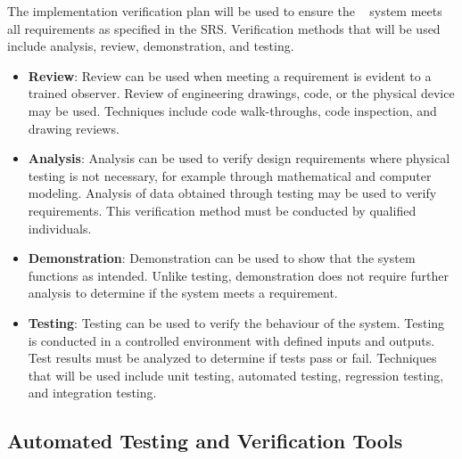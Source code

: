 \documentclass[12pt, titlepage]{article}
\begin{document}
  The implementation verification plan will be used to ensure the \progname~ system meets all requirements as specified in the SRS. Verification methods that will be used include analysis, review, demonstration, and testing. 
\begin{itemize}
  \item \textbf{Review}: Review can be used when meeting a requirement is evident to a trained observer. Review of engineering drawings, code, or the physical device may be used. Techniques include code walk-throughs, code inspection, and drawing reviews.
  \item \textbf{Analysis}: Analysis can be used to verify design requirements where physical testing is not necessary, for example through mathematical and computer modeling. Analysis of data obtained through testing may be used to verify requirements. This verification method must be conducted by qualified individuals.
  \item \textbf{Demonstration}: Demonstration can be used to show that the system functions as intended. Unlike testing, demonstration does not require further analysis to determine if the system meets a requirement.
  \item \textbf{Testing}: Testing can be used to verify the behaviour of the system. Testing is conducted in a controlled environment with defined inputs and outputs. Test results must be analyzed to determine if tests pass or fail. Techniques that will be used include unit testing, automated testing, regression testing, and integration testing.
\end{itemize}

\subsection{Automated Testing and Verification Tools}


\end{document}
